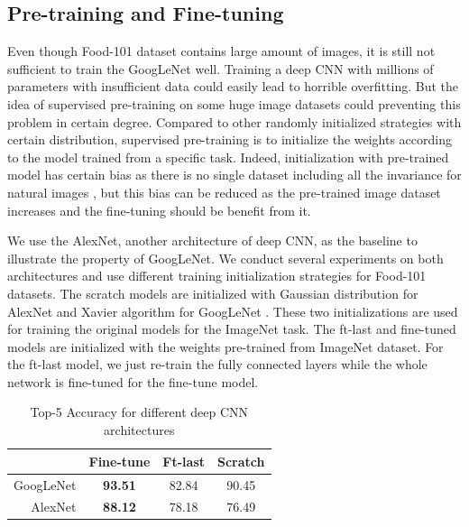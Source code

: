 \subsection{Pre-training and Fine-tuning}
Even though Food-101 dataset contains large amount of images, it is still not sufficient to train the GoogLeNet well.
Training a deep CNN with millions of parameters with insufficient data could easily lead to horrible overfitting. But the idea of supervised pre-training on some huge image datasets could preventing this problem in certain degree. Compared to other randomly initialized strategies with certain distribution, supervised pre-training is to initialize the weights according to the model trained from a specific task. Indeed, initialization with pre-trained model has certain bias as there is no single dataset including all the invariance for natural images \cite{agrawal2014analyzing}, but this bias can be reduced as the pre-trained image dataset increases and the fine-tuning should be benefit from it.

We use the AlexNet, another architecture of deep CNN, as the baseline to illustrate the property of GoogLeNet.
We conduct several experiments on both architectures and use different training initialization strategies for Food-101 datasets. The scratch models are initialized with Gaussian distribution for AlexNet and Xavier algorithm for GoogLeNet%
 \cite{glorot2010understanding}. These two initializations are used for training the original models for the ImageNet task. The ft-last and fine-tuned models are initialized with the weights pre-trained from ImageNet dataset. For the ft-last model, we just re-train the fully connected layers while the whole network is fine-tuned for the fine-tune model.
\begin{table}[htbp]
  \centering
  \caption{Top-5 Accuracy for different deep CNN architectures}
    \begin{tabular}{r|ccc}
    \toprule
          & Fine-tune & Ft-last & Scratch \\
    \midrule
    GoogLeNet & \textbf{93.51} & 82.84 & 90.45 \\
    AlexNet & \textbf{88.12} & 78.18 & 76.49 \\
    \bottomrule
    \end{tabular}%
  \label{tab:ft}%
\end{table}%



